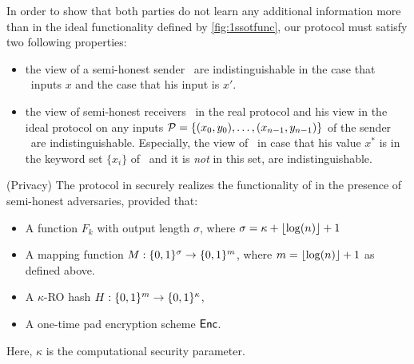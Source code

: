 In order to show that both parties do not learn any additional information more than in the ideal functionality defined by \ref{fig:1ssotfunc}, our protocol must satisfy two following properties:
\begin{itemize}
	\item the view of a semi-honest sender \SS\ are indistinguishable in the case that \RR\  inputs $x$ and the case that his input is $x'$.  
	\item  the view of semi-honest receivers \RR\ in the real protocol and his view in the ideal protocol on any inputs $\P=\{ (x_0, y_0), \ldots, (x_{n-1}, y_{n-1}) \}$ of the sender \SS\ are indistinguishable. Especially, the view of \RR\ in case that his value $x^*$ is in the keyword set $\{x_i\}$ of \SS\ and it is \textit{not} in this set, are indistinguishable.
\end{itemize}


\begin{theorem}(Privacy)
	\label{thm:sotpriv}
	The \OPPRF protocol in  securely realizes the  functionality of  in the presence of semi-honest adversaries, provided that:
	\begin{itemize}\addtolength{\itemsep}{-6pt}
		\item  A \batchOPRF function $F_k$ with output length $\sigma$, where $\sigma=\kappa+\floor{\log(n)}+1$
		\item A mapping function $M:\bool^\sigma \to \bool^m$, where $m=\floor{\log(n)}+1$ as defined above.
		\item A $\kappa$-RO hash  $H:\bool^m \to \bool^\kappa$, 
		\item A one-time pad encryption scheme $\Enc$.
	\end{itemize}
	Here,  $\kappa$ is the computational security parameter.
\end{theorem}

